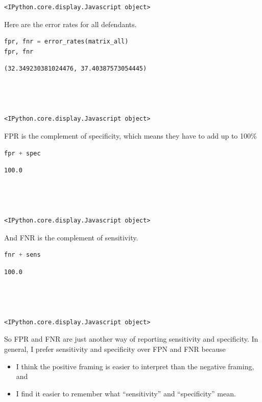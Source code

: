 \begin{lstlisting}[style=output]
<IPython.core.display.Javascript object>
\end{lstlisting}

Here are the error rates for all defendants.

\begin{lstlisting}[language=Python,style=source]
fpr, fnr = error_rates(matrix_all)
fpr, fnr
\end{lstlisting}

\begin{lstlisting}[style=output]
(32.349230381024476, 37.40387573054445)




<IPython.core.display.Javascript object>
\end{lstlisting}

FPR is the complement of specificity, which means they have to add up to
100\%

\begin{lstlisting}[language=Python,style=source]
fpr + spec
\end{lstlisting}

\begin{lstlisting}[style=output]
100.0




<IPython.core.display.Javascript object>
\end{lstlisting}

And FNR is the complement of sensitivity.

\begin{lstlisting}[language=Python,style=source]
fnr + sens
\end{lstlisting}

\begin{lstlisting}[style=output]
100.0




<IPython.core.display.Javascript object>
\end{lstlisting}

So FPR and FNR are just another way of reporting sensitivity and
specificity. In general, I prefer sensitivity and specificity over FPN
and FNR because

\begin{itemize}
\item
  I think the positive framing is easier to interpret than the negative
  framing, and
\item
  I find it easier to remember what ``sensitivity'' and ``specificity''
  mean.
\end{itemize}

